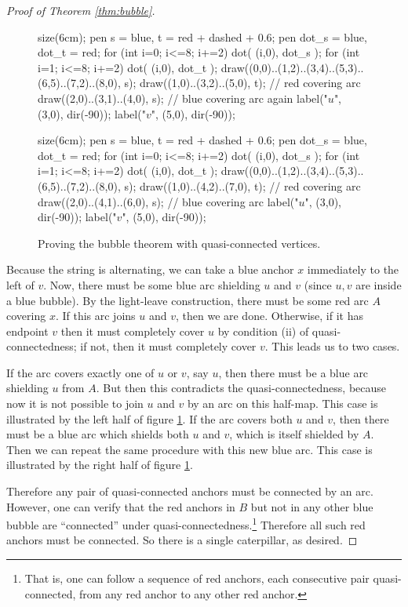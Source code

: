 \begin{proof}[Proof of Theorem \ref{thm:bubble}]
	\begin{figure}[ht]
		\centering
		\begin{asy}
			size(6cm);
			pen s = blue, t = red + dashed + 0.6;
			pen dot_s = blue, dot_t = red;
			for (int i=0; i<=8; i+=2) { dot( (i,0), dot_s ); }
			for (int i=1; i<=8; i+=2) { dot( (i,0), dot_t ); }
			draw((0,0)..(1,2)..(3,4)..(5,3)..(6,5)..(7,2)..(8,0), s);
			draw((1,0)..(3,2)..(5,0), t); // red covering arc
			draw((2,0)..(3,1)..(4,0), s); // blue covering arc again
			label("$u$", (3,0), dir(-90));
			label("$v$", (5,0), dir(-90));
		\end{asy}
		\hspace{2em}
		\begin{asy}
			size(6cm);
			pen s = blue, t = red + dashed + 0.6;
			pen dot_s = blue, dot_t = red;
			for (int i=0; i<=8; i+=2) { dot( (i,0), dot_s ); }
			for (int i=1; i<=8; i+=2) { dot( (i,0), dot_t ); }
			draw((0,0)..(1,2)..(3,4)..(5,3)..(6,5)..(7,2)..(8,0), s);
			draw((1,0)..(4,2)..(7,0), t); // red covering arc
			draw((2,0)..(4,1)..(6,0), s); // blue covering arc
			label("$u$", (3,0), dir(-90));
			label("$v$", (5,0), dir(-90));
		\end{asy}
		\caption{Proving the bubble theorem with quasi-connected vertices.}
		\label{fig:pf_bubble}
	\end{figure}
	Because the string is alternating, we can take a blue anchor $x$ immediately to the left of $v$.  Now, there must be some blue arc shielding $u$ and $v$ (since $u,v$ are inside a blue bubble).  By the light-leave construction, there must be some red arc $A$ covering $x$.  If this arc joins $u$ and $v$, then we are done.  
	Otherwise, if it has endpoint $v$ then it must completely cover $u$ by condition (ii) of quasi-connectedness; if not, then it must completely cover $v$.  This leads us to two cases.
	\begin{itemize}
		\ii If the arc covers exactly one of $u$ or $v$, say $u$, then there must be a blue arc shielding $u$ from $A$.  But then this contradicts the quasi-connectedness, because now it is not possible to join $u$ and $v$ by an arc on this half-map.  This case is illustrated by the left half of figure \ref{fig:pf_bubble}.
		\ii If the arc covers both $u$ and $v$, then there must be a blue arc which shields both $u$ and $v$, which is itself shielded by $A$.  Then we can repeat the same procedure with this new blue arc.  This case is illustrated by the right half of figure \ref{fig:pf_bubble}.
	\end{itemize}
	Therefore any pair of quasi-connected anchors must be connected by an arc.  However, one can verify that the red anchors in $B$ but not in any other blue bubble are ``connected'' under quasi-connectedness.\footnote{That is, one can follow a sequence of red anchors, each consecutive pair quasi-connected, from any red anchor to any other red anchor.}  Therefore all such red anchors must be connected.  So there is a single caterpillar, as desired.
\end{proof}


